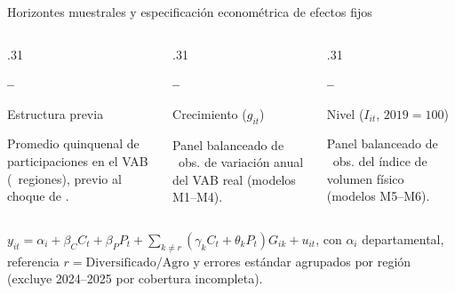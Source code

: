 \documentclass[aspectratio=169,11pt]{beamer}
\begin{document}
\begin{frame}[t]{Horizontes muestrales y especificación econométrica de efectos fijos}
\vspace{.08cm}
\begin{columns}[T,onlytextwidth]
\begin{column}{.31\textwidth}\begin{keybox}[equal height group=g5]\large\bfseries \PreStart--\PreEnd\par\medskip\normalfont\normalsize Estructura previa\par\smallskip\footnotesize Promedio quinquenal de participaciones en el VAB (\Departments\ regiones), previo al choque de \ShockYear.\end{keybox}\end{column}
\begin{column}{.31\textwidth}\begin{keybox}[equal height group=g5]\large\bfseries \RateStart--\RateEnd\par\medskip\normalfont\normalsize Crecimiento ($g_{it}$)\par\smallskip\footnotesize Panel balanceado de \RatesObs\ obs. de variación anual del VAB real (modelos M1--M4).\end{keybox}\end{column}
\begin{column}{.31\textwidth}\begin{keybox}[equal height group=g5]\large\bfseries \LevelStart--\LevelEnd\par\medskip\normalfont\normalsize Nivel ($I_{it}$, $2019=100$)\par\smallskip\footnotesize Panel balanceado de \LevelsObs\ obs. del índice de volumen físico (modelos M5--M6).\end{keybox}\end{column}
\end{columns}
\vspace{.12cm}
\begin{simplebox}
 $y_{it}=\alpha_i+\beta_C C_t+\beta_P P_t+\sum_{k\neq r}(\gamma_k C_t+\theta_k P_t)G_{ik}+u_{it}$, con $\alpha_i$ departamental, referencia $r=\text{Diversificado/Agro}$ y errores estándar agrupados por región (excluye 2024--2025 por cobertura incompleta).
\end{simplebox}
\end{frame}
\end{document}
